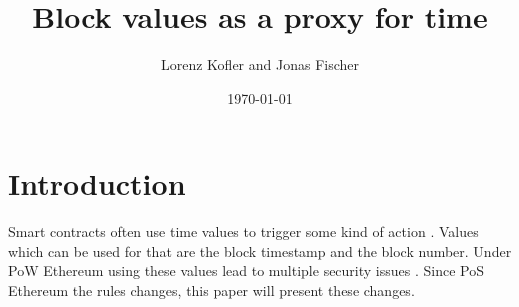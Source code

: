 \documentclass{article}
\title{Block values as a proxy for time}
\author{Lorenz Kofler and Jonas Fischer}
\date{\today}
\begin{document}
\maketitle
\tableofcontents
\newpage

\section{Introduction}

Smart contracts often use time values to trigger some kind of action
\cite{swc116}. Values which can be used for that are the block timestamp and
the block number. Under PoW Ethereum using these values lead to multiple
security issues \cite{swc116} \cite{Conkas2021} \cite{DASP2018}
\cite{Osiris2018} \cite{Oyente2016}. Since PoS Ethereum the rules changes, this
paper will present these changes.



%
% 
%
%
%

%

\newpage

\end{document}
